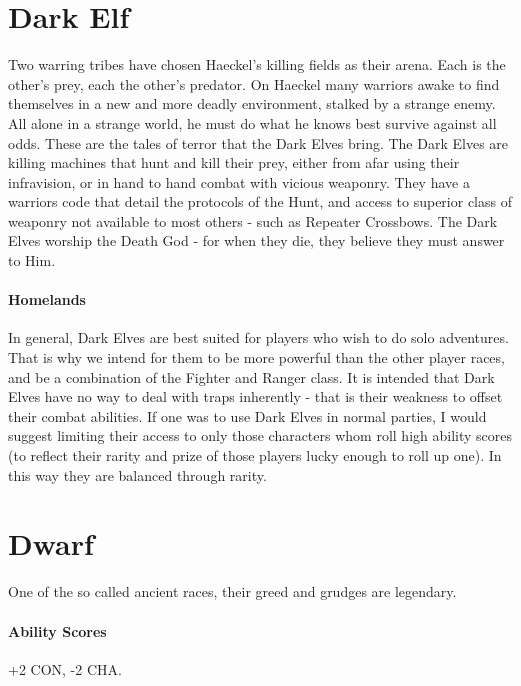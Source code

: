 \newpage
\begin{multicols}{2}

\section{Dark Elf} Two warring tribes have chosen Haeckel's killing fields as their arena. Each is the other's prey, each the other's predator. On Haeckel many warriors awake to find themselves in a new and more deadly environment, stalked by a strange enemy. All alone in a strange world, he must do what he knows best survive against all odds. These are the tales of terror that the Dark Elves bring. The Dark Elves are killing machines that hunt and kill their prey, either from afar using their infravision, or in hand to hand combat with vicious weaponry. They have a warriors code that detail the protocols of the Hunt, and access to superior class of weaponry not available to most others - such as Repeater Crossbows. The Dark Elves worship the Death God - for when they die, they believe they must answer to Him.

\paragraph{Homelands}

\begin{framed}\centering
In general, Dark Elves are best suited for players who wish to do solo adventures. That is why we intend for them to be more powerful than the other player races, and be a combination of the Fighter and Ranger class. It is intended that Dark Elves have no way to deal with traps inherently - that is their weakness to offset their combat abilities. If one was to use Dark Elves in normal parties, I would suggest limiting their access to only those characters whom roll high ability scores (to reflect their rarity and prize of those players lucky enough to roll up one). In this way they are balanced through rarity.
 \end{framed}


\section{Dwarf}

One of the so called ancient races, their greed and grudges are legendary.     

    \paragraph{Ability Scores} +2 CON, -2 CHA.

\end{multicols}
